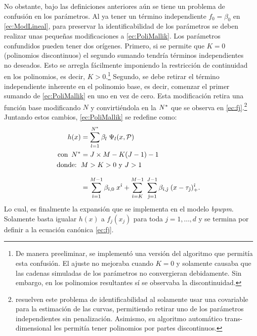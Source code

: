\documentclass[../Main/Main.tex]{subfiles}
\begin{document}
No obstante, bajo las definiciones anteriores aún se tiene un problema de confusión en los parámetros. Al ya tener un término independiente $f_0 = \beta_0$ en \eqref{ec:ModLineal}, para preservar la identificabilidad de los parámetros se deben realizar unas pequeñas modificaciones a \eqref{ec:PoliMallik}. Los parámetros confundidos pueden tener dos orígenes. Primero, si se permite que $K = 0$ (polinomios discontinuos) el segundo sumando tendría términos independientes no deseados. Esto se arregla fácilmente imponiendo la restricción de continuidad en los polinomios, es decir, $K > 0$.\footnote{De manera preeliminar, se implementó una versión del algoritmo que permitía esta confusión. El ajuste no mejoraba cuando $K = 0$ y solamente causaba que las cadenas simuladas de los parámetros no convergieran debidamente. Sin embargo, en los polinomios resultantes sí se observaba la discontinuidad.} Segundo, se debe retirar el término independiente inherente en el polinomio base, es decir, comenzar el primer sumando de \eqref{ec:PoliMallik} en uno en vez de cero. Esta modificación retira una función base modificando $N$ y convirtiéndola en la $N^*$ que se observa en \eqref{ec:fj}.\footnote{\citeauthor{mallik1998automatic} resuelven este problema de identificabilidad al solamente usar una covariable para la estimación de las curvas, permitiendo retirar uno de los parámetros independientes sin penalización. Asimismo, su algoritmo automático trans-dimensional les permitía tener polinomios por partes discontinuos.} Juntando estos cambios, \eqref{ec:PoliMallik} se redefine como:
\begin{align}
	h(x) &= \sum_{l = 1}^{N^*} \beta_l \; \Psi_l(x,\mathcal{P}) \nonumber\\ 
	\text{con } \, N^* &= J\times M - K(J-1) - 1\nonumber \\
	\text{donde: } \, & M > K > 0 \text{ y } J > 1 \nonumber \\[7pt]
 		 &=	\sum_{\hat{\imath} = 1}^{M - 1} \beta_{\hat{\imath},0} \; x^{\hat{\imath}} + 
		\sum_{\hat{\imath} = K}^{M-1} \;
	 		\sum_{\hat{\jmath} = 1}^{J-1}\beta_{\hat{\imath},\hat{\jmath}}\;(x - \tau_{\hat{\jmath}})_+^{\hat{\imath}}.
	 			\label{ec:PoliFinal}
\end{align}
Lo cual, es finalmente la expansión que se implementa en el modelo \textit{bpwpm}. Solamente basta igualar $h(x)$ a $f_j(x_j)$ para toda $j = 1,\ldots,d$ y se termina por definir a la ecuación canónica \eqref{ec:fj}.
\end{document}
